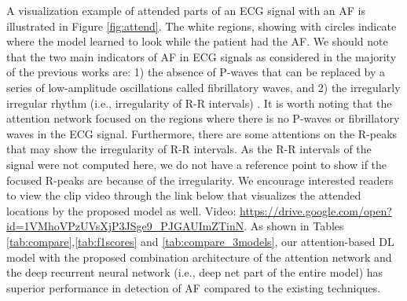 \documentclass[conference]{IEEEtran}
\begin{document}
A visualization example of attended parts of an ECG signal with an AF is illustrated in Figure \ref{fig:attend}. The white regions, showing with circles indicate where the model learned to look while the patient had the  AF. We should note that the two main indicators of AF in ECG signals as considered in the majority of the previous works are: 1) the absence of P-waves that can be replaced by a series of low-amplitude oscillations called fibrillatory waves, and 2) the irregularly irregular rhythm (i.e., irregularity of R-R intervals) \cite{jiang2012high,babaeizadeh2009improvements,huang2011novel}. It is worth noting that the attention network focused on the regions where there is no P-waves or fibrillatory waves in the ECG signal. Furthermore, there are some attentions on the R-peaks that may show the irregularity of R-R intervals. As the R-R intervals of the signal were not computed here, we do not have a reference point to show if the focused R-peaks are because of the irregularity. We encourage interested readers to view the clip video through the link below that visualizes the attended locations by the proposed model as well.
Video: \url{https://drive.google.com/open?id=1VMhoVPzUVsXjP3JSge9_PJGAUImZTinN}. As shown in Tables \ref{tab:compare},\ref{tab:f1scores} and \ref{tab:compare_3models}, our attention-based DL model with the proposed combination architecture of the attention network and the deep recurrent neural network (i.e., deep net part of the entire model) has superior performance in detection of AF compared to the existing techniques. 


\begin{table*} [htb] 
\caption{ scores of each classification type obtained by the proposed method on different PhysioNet databases.}
\end{table*}
\end{document}
